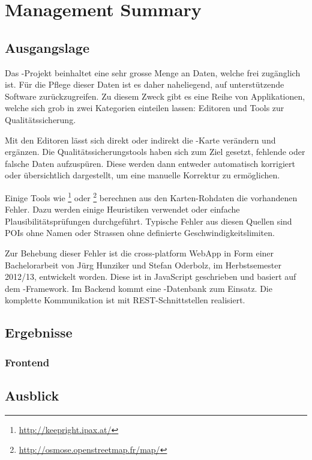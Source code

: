 \chapter*{Management Summary}
\thispagestyle{scrheadings}

\section*{Ausgangslage}
Das -Projekt beinhaltet eine sehr grosse Menge an Daten, welche frei zugänglich ist.
Für die Pflege dieser Daten ist es daher naheliegend, auf unterstützende Software zurückzugreifen.
Zu diesem Zweck gibt es eine Reihe von Applikationen, welche sich grob in zwei Kategorien einteilen lassen:
Editoren und Tools zur Qualitätssicherung.

Mit den Editoren lässt sich direkt oder indirekt die -Karte verändern und ergänzen.
Die Qualitätssicherungstools haben sich zum Ziel gesetzt, fehlende oder falsche Daten aufzuspüren.
Diese werden dann entweder automatisch korrigiert oder übersichtlich dargestellt, um eine manuelle Korrektur zu ermöglichen.

Einige Tools wie \footnote{\url{http://keepright.ipax.at/}} oder \footnote{\url{http://osmose.openstreetmap.fr/map/}} berechnen aus den Karten-Rohdaten die vorhandenen Fehler.
Dazu werden einige Heuristiken verwendet oder einfache Plausibilitätsprüfungen durchgeführt.
Typische Fehler aus diesen Quellen sind \glspl{POI} ohne Namen oder Strassen ohne definierte Geschwindigkeitslimiten.

Zur Behebung dieser Fehler ist die cross-platform \gls{WebApp} \kort{} in Form einer Bachelorarbeit von Jürg Hunziker und Stefan Oderbolz, im Herbstsemester 2012/13, entwickelt  worden. 
Diese ist in JavaScript geschrieben und basiert auf dem -Framework.
Im Backend kommt eine -Datenbank zum Einsatz. Die komplette Kommunikation ist mit \gls{REST}-Schnittstellen realisiert.


\section*{Ergebnisse}

\subsection*{Frontend}

\section*{Ausblick}
